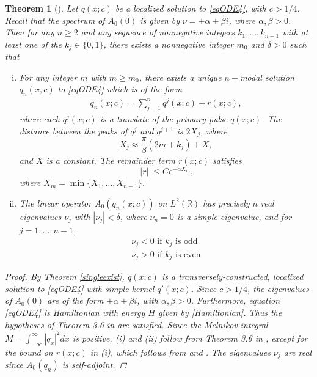 \documentclass[12pt]{article}
\def\R{{\mathbb R}}
\newtheorem{theorem}{Theorem}
\begin{document}
\begin{theorem}[\cite{Sandstede1997}]\label{multiexist}
Let $q(x; c)$ be a localized solution to \eqref{eqODE4}, with $c > 1/4$. Recall that the spectrum of $A_0(0)$ is given by $\nu = \pm \alpha \pm \beta i$, where $\alpha, \beta > 0$. Then for any $n \geq 2$ and any sequence of nonnegative integers $k_1, \dots, k_{n-1}$ with at least one of the $k_j \in \{0, 1 \}$, there exists a nonnegative integer $m_0$ and $\delta > 0$ such that
\begin{enumerate}[(i)]
	\item For any integer $m$ with $m \geq m_0$, there exists a unique $n-$modal solution $q_n(x, c)$ to \eqref{eqODE4} which is of the form
	\begin{align}\label{qn}
	q_n(x; c) = \sum_{j = 1}^{n} q^j(x; c) + r(x; c),
	\end{align}
	where each $q^j(x; c)$ is a translate of the primary pulse $q(x; c)$. The distance between the peaks of $q^j$ and $q^{j+1}$ is $2 X_j$, where
	\begin{equation*}
	X_j \approx \frac{\pi}{\beta}(2 m + k_j) + \tilde{X},
	\end{equation*}
	and $\tilde{X}$ is a constant. The remainder term $r(x; c)$ satisfies
	\begin{equation}\label{rbound}
	||r|| \leq C e^{-\alpha X_m},
	\end{equation}
	where $X_m = \min\{X_1, \dots, X_{n-1}\}$.

	\item The linear operator $A_0(q_n(x; c))$ on $L^2(\R)$ has precisely $n$ real eigenvalues $\nu_j$ with $|\nu_j| < \delta$, where $\nu_n = 0$ is a simple eigenvalue, and for $j = 1, \dots, n-1$,
	\begin{align*}
	\nu_j < 0 \text{ if } k_j \text{ is odd} \\
	\nu_j > 0 \text{ if } k_j \text{ is even} 
	\end{align*}

\end{enumerate}

\begin{proof}
By Theorem \ref{singleexist}, $q(x; c)$ is a transversely-constructed, localized solution to \eqref{eqODE4} with simple kernel $q'(x; c)$. Since $c > 1/4$, the eigenvalues of $A_0(0)$ are of the form $\pm \alpha \pm \beta i$, with $\alpha, \beta > 0$. Furthermore, equation \eqref{eqODE4} is Hamiltonian with energy $H$ given by \eqref{Hamiltonian}. Thus the hypotheses of Theorem 3.6 in \cite{Sandstede1997} are satisfied. Since the Melnikov integral $M = \int_{-\infty}^\infty |q_x|^2 dx$ is positive, (i) and (ii) follow from Theorem 3.6 in \cite{Sandstede1997}, except for the bound on $r(x; c)$ in (i), which follows from \cite{Sanstede1993} and \cite{Sandstede1998}. The eigenvalues $\nu_j$ are real since $A_0(q_n)$ is self-adjoint.
\end{proof}
\end{theorem}
\end{document}
